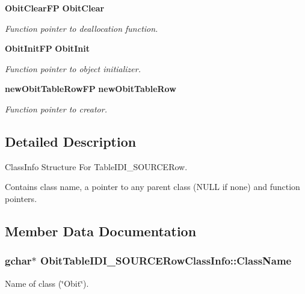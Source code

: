 \begin{CompactItemize}
{\bf Obit\-Clear\-FP} {\bf Obit\-Clear}
\begin{CompactList}\small\item\em Function pointer to deallocation function. \item\end{CompactList}\item 
{\bf Obit\-Init\-FP} {\bf Obit\-Init}
\begin{CompactList}\small\item\em Function pointer to object initializer. \item\end{CompactList}\item 
{\bf new\-Obit\-Table\-Row\-FP} {\bf new\-Obit\-Table\-Row}
\begin{CompactList}\small\item\em Function pointer to creator. \item\end{CompactList}\end{CompactItemize}


\subsection{Detailed Description}
Class\-Info Structure For Table\-IDI\_\-SOURCERow. 

Contains class name, a pointer to any parent class (NULL if none) and function pointers. 



\subsection{Member Data Documentation}
\subsubsection{\setlength{\rightskip}{0pt plus 5cm}gchar$\ast$ {\bf Obit\-Table\-IDI\_\-SOURCERow\-Class\-Info::Class\-Name}}\label{structObitTableIDI__SOURCERowClassInfo_o2}


Name of class (\char`\"{}Obit\char`\"{}). 

